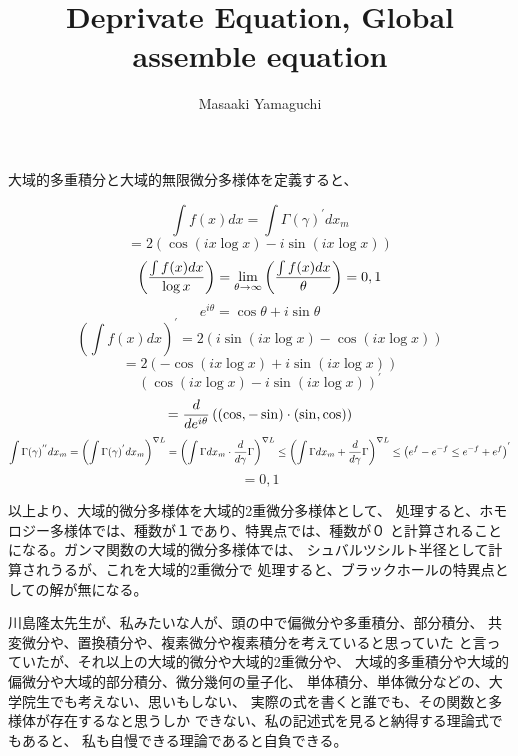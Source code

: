 \documentclass{jsarticle}
\begin{document}
\title{Deprivate Equation, Global assemble equation}
\author{Masaaki Yamaguchi}
\date{}
\maketitle


   大域的多重積分と大域的無限微分多様体を定義すると、

   $$ \int f(x)dx = \int \Gamma(\gamma)^{'}dx_m $$
   $$ = 2 (\cos (i x \log x) - i \sin(i x \log x)) $$
   $$ \left({{\int f(x) dx} \over \log x}\right) = \lim_{\theta \to \infty}
    \left({{\int f(x) dx} \over \theta}\right) = 0,1 $$
    $$ e^{i \theta} = \cos \theta + i \sin \theta $$
    $$ \left({\int f(x) dx}\right)^{'} = 2 (i \sin(i x \log x) - \cos (i x \log
    x)) $$
    $$ = 2(- \cos(i x \log x) + i \sin(i x \log x)) $$
    $$ (\cos (i x \log x) - i \sin(i x \log x))^{'} $$
    $$ = {d \over {d {e^{i\theta}}}}\left((\cos, - \sin )\cdot
    (\sin, \cos)\right)  $$
    $$ \int \Gamma(\gamma)^{''}dx_m = \left({\int \Gamma(\gamma)^{'}}dx_m
    \right)^{\nabla L} = \left({{\int \Gamma dx_m} \cdot {{d \over d\gamma}
    \Gamma}}\right)^{\nabla L} \le 
    \left({\int \Gamma dx_m + {d \over d\gamma}\Gamma}\right)^{\nabla L} \le 
    \left({e^{f} - e^{-f}} \le {e^{-f} + e^{f}}\right)^{'}  $$
    $$ = 0,1 $$

    以上より、大域的微分多様体を大域的2重微分多様体として、
    処理すると、ホモロジー多様体では、種数が１であり、特異点では、種数が０
    と計算されることになる。ガンマ関数の大域的微分多様体では、
    シュバルツシルト半径として計算されうるが、これを大域的2重微分で
    処理すると、ブラックホールの特異点としての解が無になる。

    川島隆太先生が、私みたいな人が、頭の中で偏微分や多重積分、部分積分、
    共変微分や、置換積分や、複素微分や複素積分を考えていると思っていた
    と言っていたが、それ以上の大域的微分や大域的2重微分や、
    大域的多重積分や大域的偏微分や大域的部分積分、微分幾何の量子化、
    単体積分、単体微分などの、大学院生でも考えない、思いもしない、
    実際の式を書くと誰でも、その関数と多様体が存在するなと思うしか
    できない、私の記述式を見ると納得する理論式でもあると、
    私も自慢できる理論であると自負できる。
\end{document}
